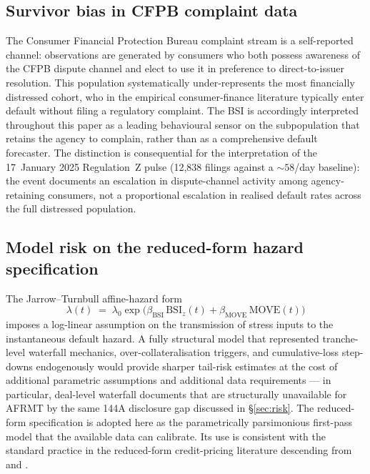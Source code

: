 \documentclass[11pt,letterpaper]{article}
\newcommand{\bsi}{\text{BSI}}
\newcommand{\move}{\text{MOVE}}
\begin{document}
\subsection{Survivor bias in CFPB complaint data}
\label{sec:rob-survivor}
The Consumer Financial Protection Bureau complaint stream is a
self-reported channel: observations are generated by consumers
who both possess awareness of the CFPB dispute channel and elect
to use it in preference to direct-to-issuer resolution. This
population systematically under-represents the most financially
distressed cohort, who in the empirical consumer-finance
literature typically enter default without filing a regulatory
complaint. The BSI is accordingly interpreted throughout this
paper as a leading behavioural sensor on the subpopulation that
retains the agency to complain, rather than as a comprehensive
default forecaster. The distinction is consequential for the
interpretation of the 17~January 2025 Regulation~Z pulse (12{,}838
filings against a $\sim\!58$/day baseline): the event documents an
escalation in dispute-channel activity among agency-retaining
consumers, not a proportional escalation in realised default rates
across the full distressed population.

\subsection{Model risk on the reduced-form hazard specification}
\label{sec:rob-model}
The Jarrow--Turnbull affine-hazard form
\[
\lambda(t) \;=\; \lambda_0\exp\!\bigl(\beta_{\bsi}\,\bsi_z(t) + \beta_{\move}\,\move(t)\bigr)
\]
imposes a log-linear assumption on the transmission of stress
inputs to the instantaneous default hazard. A fully structural
model that represented tranche-level waterfall mechanics,
over-collateralisation triggers, and cumulative-loss step-downs
endogenously would provide sharper tail-risk estimates at the
cost of additional parametric assumptions and additional data
requirements --- in particular, deal-level waterfall documents
that are structurally unavailable for AFRMT by the same 144A
disclosure gap discussed in \S\ref{sec:risk}. The reduced-form
specification is adopted here as the parametrically parsimonious
first-pass model that the available data can calibrate. Its use
is consistent with the standard practice in the reduced-form
credit-pricing literature descending from
\citet{jarrow1995pricing} and \citet{duffie1999modeling}.


\end{document}
